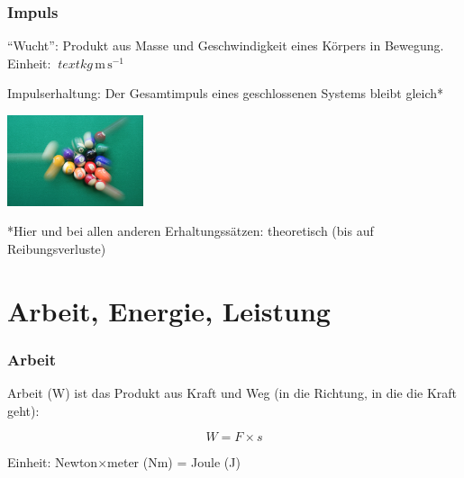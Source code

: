 \documentclass{beamer}
\begin{document}
\begin{frame}
\frametitle{Impuls}

``Wucht'': Produkt aus Masse und Geschwindigkeit eines Körpers in Bewegung. Einheit: \(\
text{kg}\,\text{m}\,\text{s}^{-1}\)

\pause

Impulserhaltung: Der Gesamtimpuls eines geschlossenen Systems bleibt gleich* 

\begin{center}
\includegraphics[width=0.3\textwidth]{billard.jpg}
\end{center}



 *Hier und bei allen anderen  Erhaltungssätzen: theoretisch (bis auf Reibungsverluste)
\end{frame}













\section{Arbeit, Energie, Leistung}


\begin{frame}
\frametitle{Arbeit}

Arbeit (W) ist das Produkt aus Kraft und Weg (in die Richtung, in die die Kraft geht):

\[W = F\times s\]

Einheit: Newton\(\times\)meter (Nm) = Joule (J)  

\end{frame}
\end{document}

